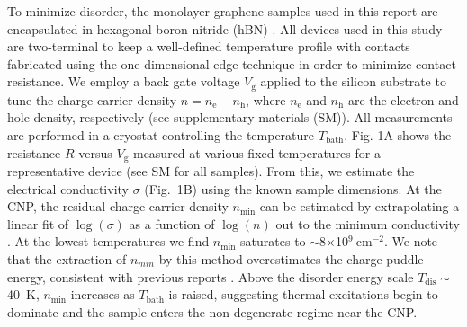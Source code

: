 \documentclass[10pt, oneside]{book}
\begin{document}
\begin{doublespace}
To minimize disorder, the monolayer graphene samples used in this report are encapsulated in hexagonal boron nitride (hBN) \cite{deancr}. All devices used in this study are two-terminal to keep a well-defined temperature profile \cite{fong} with contacts fabricated using the one-dimensional edge technique \cite{wang13} in order to minimize contact resistance. We employ a back gate voltage $V_{\mathrm{g}}$ applied to the silicon substrate to tune the charge carrier density $n=n_{\mathrm{e}}-n_{\mathrm{h}}$, where $n_{\mathrm{e}}$ and $n_{\mathrm{h}}$ are the electron and hole density, respectively (see supplementary materials (SM)). All measurements are performed in a cryostat controlling the temperature $T_{\mathrm{bath}}$. Fig. 1A shows the resistance $R$ versus $V_{\mathrm{g}}$ measured at various fixed temperatures for a representative device (see SM for all samples). From this, we estimate the electrical conductivity $\sigma$ (Fig.~1B) using the known sample dimensions. At the CNP, the residual charge carrier density $n_{\mathrm{min}}$ can be estimated by extrapolating a linear fit of $\log(\sigma)$ as a function of $\log(n)$ out to the minimum conductivity \cite{couto}. At the lowest temperatures we find $n_{\mathrm{min}}$ saturates to $\sim$8$\times$10$^9~$cm$^{-2}$. We note that the extraction of $n_{min}$ by this method overestimates the charge puddle energy, consistent with previous reports \cite{deancr}. Above the disorder energy scale $T_{\mathrm{dis}}\sim$40~K, $n_{\mathrm{min}}$ increases as $T_{\mathrm{bath}}$ is raised, suggesting thermal excitations begin to dominate and the sample enters the non-degenerate regime near the CNP.


\end{doublespace}
\end{document}
